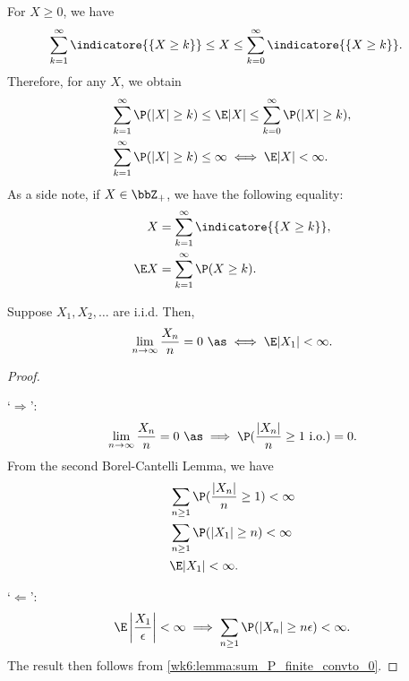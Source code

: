 \documentclass[../aipt.tex]{subfiles}
\begin{document}
%
For $X \geq 0$, we have
\begin{align*}
\sum_{k=1}^{\infty} \indicatore{\{X \geq k\}} &\leq X \leq \sum_{k=0}^{\infty} \indicatore{\{X \geq k\}}.
\end{align*}
Therefore, for any $X$, we obtain
\begin{align*}
\sum_{k=1}^{\infty} \P(|X| \geq k) &\leq \E |X| \leq \sum_{k=0}^{\infty} \P(|X| \geq k),\\
\sum_{k=1}^{\infty} \P(|X| \geq k) &\leq \infty \iff \E |X| < \infty.
\end{align*}
As a side note, if $X \in \bbZ_{+}$, we have the following equality:
\begin{align*}
X &= \sum_{k=1}^{\infty} \indicatore{\{X \geq k\}},\\
\E X &= \sum_{k=1}^{\infty} \P(X \geq k).
\end{align*}
%
\begin{Lemma}
Suppose $X_1, X_2, \ldots$ are i.i.d. Then,
\begin{align*}
\lim_{n \to \infty} \frac{X_n}{n} = 0\ \as \iff \E |X_1| < \infty.
\end{align*}
\end{Lemma}
\begin{proof}\

`$\Rightarrow$':
\begin{align*}
\lim_{n \to \infty} \frac{X_n}{n} = 0\ \as \implies \P(\frac{|X_n|}{n} \geq 1 \io)=0.
\end{align*}
From the second Borel-Cantelli Lemma, we have
\begin{align*}
&\sum_{n \geq 1}\P(\frac{|X_n|}{n} \geq 1) < \infty \\
&\sum_{n \geq 1}\P(|X_1| \geq n) < \infty \\
&\E |X_1| < \infty.
\end{align*}

`$\Leftarrow$':
\begin{align*}
\E \left|\frac{X_1}{\epsilon}\right| < \infty
\implies
\sum_{n \geq 1}\P(|X_n| \geq n \epsilon) < \infty.
\end{align*}
The result then follows from \cref{wk6:lemma:sum_P_finite_convto_0}.
\end{proof}

%

\end{document}

